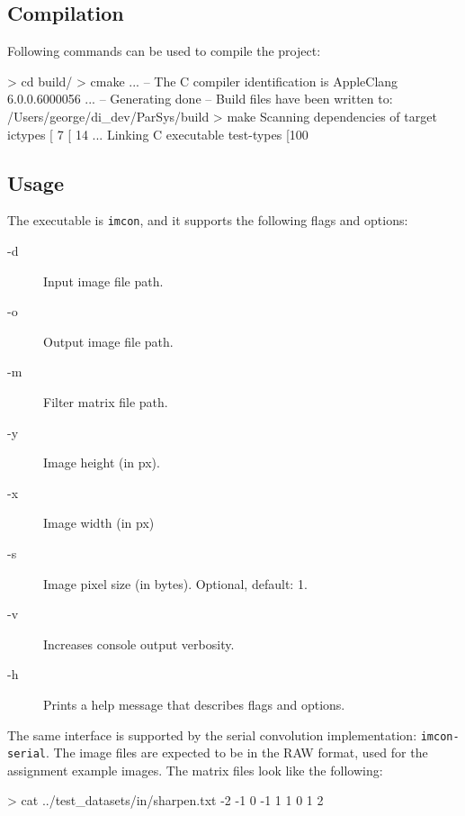\documentclass[11pt,a4paper,oneside]{article}
\begin{document}
\subsection{Compilation}

Following commands can be used to compile the project:

\begin{consolecode}
    > cd build/
    > cmake ...
    -- The C compiler identification is AppleClang 6.0.0.6000056
    ...
    -- Generating done
    -- Build files have been written to: /Users/george/di_dev/ParSys/build
    > make
    Scanning dependencies of target ictypes
    [  7%
    [ 14%
    ...
    Linking C executable test-types
    [100%
\end{consolecode}

\subsection{Usage}

The executable is \texttt{imcon}, and it supports the following flags and
options:

\begin{description}
    \item[-d] Input image file path.
    \item[-o] Output image file path.
    \item[-m] Filter matrix file path.
    \item[-y] Image height (in px).
    \item[-x] Image width (in px)
    \item[-s] Image pixel size (in bytes). Optional, default: 1.
    \item[-v] Increases console output verbosity.
    \item[-h] Prints a help message that describes flags and options.
\end{description}

The same interface is supported by the serial convolution implementation:
\texttt{imcon-serial}. The image files are expected to be in the RAW format,
used for the assignment example images. The matrix files look like the
following:

\begin{consolecode}
    > cat ../test_datasets/in/sharpen.txt
    -2 -1 0
    -1 1 1
    0 1 2
\end{consolecode}
\end{document}

